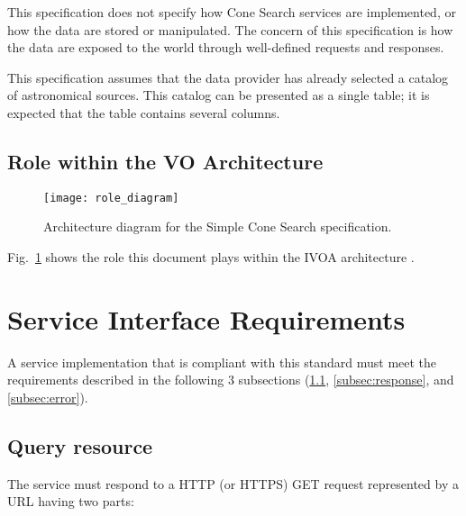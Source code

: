 \documentclass[11pt,a4paper]{ivoa}
\begin{document}
This specification does not specify how Cone Search services are
implemented, or how the data are stored or manipulated. The concern of
this specification is how the data are exposed to the world through
well-defined requests and responses.

This specification assumes that the data provider has already selected a
catalog of astronomical sources. This catalog can be presented as a
single table; it is expected that the table contains several columns.

\subsection{Role within the VO Architecture}

\begin{figure} \centering
\texttt{[image: role\_diagram]}
\caption{Architecture diagram for the Simple Cone Search
specification.}
\label{fig:archdiag} 
\end{figure}

Fig.~\ref{fig:archdiag} shows the role this document plays within the
IVOA architecture \citep{2021ivoa.spec.1101D}.

\section{Service Interface Requirements}
\label{sec:2}

A service implementation that is compliant with this standard must meet
the requirements described in the following 3 subsections
(\ref{subsec:baseurl}, \ref{subsec:response}, and \ref{subsec:error}).

\subsection{Query resource}
\label{subsec:baseurl}

The service must respond to a HTTP (or HTTPS) GET request
represented by a URL having two parts:\\ 
\end{document}
